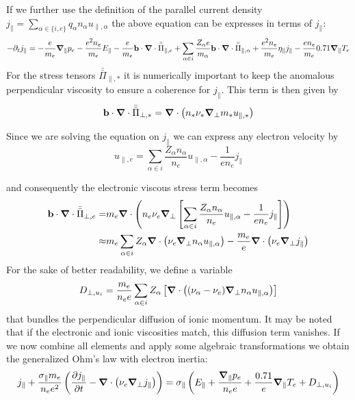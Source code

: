 If we further use the definition of the parallel current density $
j_\parallel = \sum_{\alpha \in \{i,e\}} q_\alpha n_\alpha u_{\parallel,\alpha} $ the above equation can be expresses in terms of $j_\parallel$:
$$
-\partial_tj_\parallel = -\frac{e}{m_e}\grad_\parallel p_e - \frac{e^2n_e}{m_e}E_\parallel - \frac{e}{m_e}\mathbf{b}\cdot\grad\cdot\bar{\bar{\Pi}}_{\parallel,e}  + \sum_{\alpha \in i}\frac{Z_\alpha e}{m_\alpha} \mathbf{b}\cdot\grad\cdot\bar{\bar{\Pi}}_{\parallel,\alpha} + \frac{e^2n_e}{m_e}\eta_\parallel j_\parallel - \frac{en_e}{m_e}0.71\grad_\parallel T_e
$$
For the stress tensors $\bar{\bar{\Pi}}_{\parallel,*}$ it is numerically important to keep the anomalous perpendicular viscosity to ensure a coherence for $j_\parallel$. This term is then given by
$$
\mathbf{b}\cdot\grad\cdot\bar{\bar{\Pi}}_{\perp,*} = \grad\cdot\left(n_*\nu_*\grad_\perp m_*u_{\parallel,*}\right)
$$

Since we are solving the equation on $j_\parallel$ we can express any electron velocity by
$$
u_{\parallel,e} = \sum_{\alpha \in i}\frac{Z_\alpha n_\alpha}{n_e} u_{\parallel,\alpha} - \frac{1}{en_e}j_\parallel
$$

and consequently the electronic viscous stress term becomes
\begin{align*}
	\mathbf{b}\cdot\grad\cdot\bar{\bar{\Pi}}_{\perp,e} =& m_e\grad\cdot\left(n_e\nu_e\grad_\perp\left[\sum_{\alpha \in i}\frac{Z_\alpha n_\alpha}{n_e} u_{\parallel,\alpha} - \frac{1}{en_e}j_\parallel \right]\right) \\
	\approx& m_e\sum_{\alpha \in i}Z_\alpha\grad\cdot\left(\nu_e\grad_\perp n_\alpha u_{\parallel,\alpha}\right) - \frac{m_e}{e}\grad\cdot\left(\nu_e\grad_\perp j_\parallel\right)
\end{align*}
For the sake of better readability, we define a variable 
$$
D_{\perp,u_i} = \frac{m_e}{n_ee}\sum_{\alpha \in i}Z_\alpha\left[\grad\cdot\left((\nu_\alpha - \nu_e)\grad_\perp n_\alpha u_{\parallel,\alpha}\right)\right]
$$ 
that bundles the perpendicular diffusion of ionic momentum. It may be noted that if the electronic and ionic viscosities match, this diffusion term vanishes. If we now combine all elements and apply some algebraic transformations we obtain the generalized Ohm's law with electron inertia: 
\begin{equation}
	\label{eq:OhmLaw_with_electronInertia}
	j_\parallel + \frac{\sigma_\parallel m_e}{n_ee^2} \left(\pdv{j_\parallel}{t} - \grad\cdot\left(\nu_e\grad_\perp j_\parallel\right)\right) = \sigma_\parallel \left(E_\parallel + \frac{\grad_\parallel p_e}{n_ee} + \frac{0.71}{e}\grad_\parallel T_e + D_{\perp,u_i}\right)
\end{equation}


